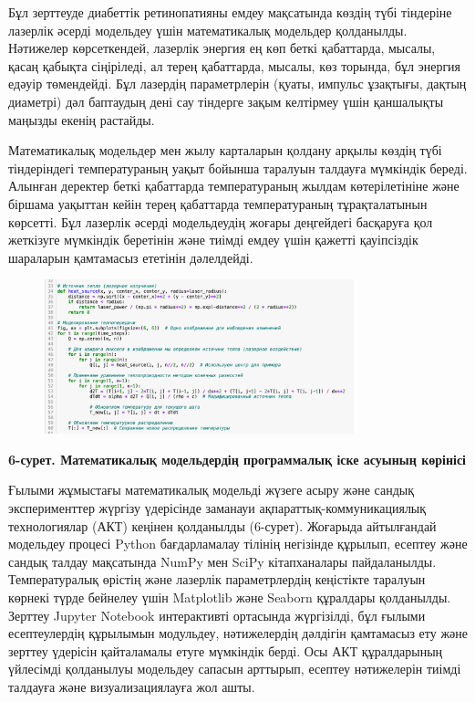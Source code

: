 Бұл зерттеуде диабеттік ретинопатияны емдеу мақсатында көздің түбі
тіндеріне лазерлік әсерді модельдеу үшін математикалық модельдер
қолданылды. Нәтижелер көрсеткендей, лазерлік энергия ең көп беткі
қабаттарда, мысалы, қасаң қабықта сіңіріледі, ал терең қабаттарда,
мысалы, көз торында, бұл энергия едәуір төмендейді. Бұл лазердің
параметрлерін (қуаты, импульс ұзақтығы, дақтың диаметрі) дәл баптаудың
дені сау тіндерге зақым келтірмеу үшін қаншалықты маңызды екенің
растайды.

Математикалық модельдер мен жылу карталарын қолдану арқылы көздің түбі
тіндеріндегі температураның уақыт бойынша таралуын талдауға мүмкіндік
береді. Алынған деректер беткі қабаттарда температураның жылдам
көтерілетініне және біршама уақыттан кейін терең қабаттарда
температураның тұрақталатынын көрсетті. Бұл лазерлік әсерді модельдеудің
жоғары деңгейдегі басқаруға қол жеткізуге мүмкіндік беретінін және
тиімді емдеу үшін қажетті қауіпсіздік шараларын қамтамасыз ететінін
дәлелдейді.


\begin{figure}[H]
	\centering
	\includegraphics[width=0.8\textwidth]{media/ict/image25}
	\caption*{}
\end{figure}


{\bfseries 6-сурет. Математикалық модельдердің программалық іске асуының
көрінісі}

Ғылыми жұмыстағы математикалық модельді жүзеге асыру және сандық
эксперименттер жүргізу үдерісінде заманауи ақпараттық-коммуникациялық
технологиялар (АКТ) кеңінен қолданылды (6-сурет). Жоғарыда айтылғандай
модельдеу процесі Python бағдарламалау тілінің негізінде құрылып,
есептеу және сандық талдау мақсатында NumPy мен SciPy кітапханалары
пайдаланылды. Температуралық өрістің және лазерлік параметрлердің
кеңістікте таралуын көрнекі түрде бейнелеу үшін Matplotlib және Seaborn
құралдары қолданылды. Зерттеу Jupyter Notebook интерактивті ортасында
жүргізілді, бұл ғылыми есептеулердің құрылымын модульдеу, нәтижелердің
дәлдігін қамтамасыз ету және зерттеу үдерісін қайталамалы етуге
мүмкіндік берді. Осы АКТ құралдарының үйлесімді қолданылуы модельдеу
сапасын арттырып, есептеу нәтижелерін тиімді талдауға және
визуализациялауға жол ашты.

